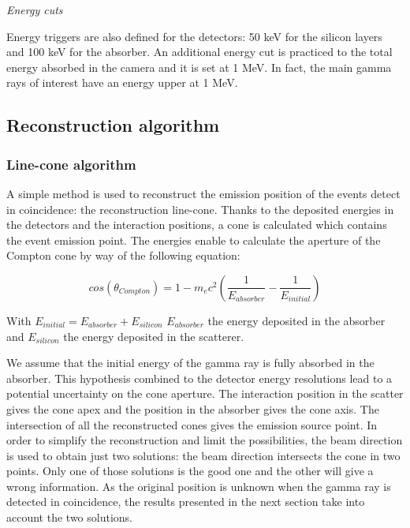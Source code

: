 \documentclass[12pt]{iopart}
\begin{document}
\textit{Energy cuts}\newline

Energy triggers are also defined for the detectors: 50 keV for the silicon layers and 100 keV for the absorber. An additional energy cut is practiced to the total energy absorbed in the camera and it is set at 1 MeV. In fact, the main gamma rays of interest have an energy upper at 1 MeV.

\subsection{Reconstruction algorithm}

\subsubsection{Line-cone algorithm\newline}
A simple method is used to reconstruct the emission position of the events detect in coincidence: the reconstruction line-cone. Thanks to the deposited energies in the detectors and the interaction positions, a cone is calculated which contains the event emission point. The energies enable to calculate the aperture of the Compton cone by way of the following equation:

\begin{equation}
cos(\theta_{Compton}) = 1-m_ec^2\left(\frac{1}{E_{absorber}}-\frac{1}{E_{initial}}\right)
\end{equation}

	
With $E_{initial} = E_{absorber} + E_{silicon}$\newline
$E_{absorber}$ the energy deposited in the absorber and $E_{silicon}$ the energy deposited in the scatterer.\newline

We assume that the initial energy of the gamma ray is fully absorbed in the absorber. This hypothesis combined to the detector energy resolutions lead to a potential uncertainty on the cone aperture. The interaction position in the scatter gives the cone apex and the position in the absorber gives the cone axis. The intersection of all the reconstructed cones gives the emission source point. In order to simplify the reconstruction and limit the possibilities, the beam direction is used to obtain just two solutions: the beam direction intersects the cone in two points. Only one of those solutions is the good one and the other will give a wrong information. As the original position is unknown when the gamma ray is detected in coincidence, the results presented in the next section take into account the two solutions.\newline
\end{document}
